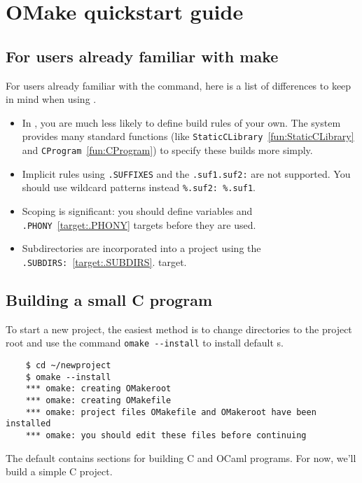 %
%
\chapter{OMake quickstart guide}
\label{chapter:quickstart}

\section{For users already familiar with make}

For users already familiar with the  command, here is a list of
differences to keep in mind when using .

\begin{itemize}
\item In , you are much less likely to define build rules of your own.
  The system provides many standard functions (like \verb+StaticCLibrary+~\ref{fun:StaticCLibrary} and \verb+CProgram+~\ref{fun:CProgram})
  to specify these builds more simply.
\item Implicit rules using \verb+.SUFFIXES+ and the \verb+.suf1.suf2:+ are not supported.
  You should use wildcard patterns instead \verb+%.suf2: %.suf1+.
\item Scoping is significant: you should define variables and \verb+.PHONY+~\ref{target:.PHONY} targets before they are used.
\item Subdirectories are incorporated into a project using the \verb+.SUBDIRS:+~\ref{target:.SUBDIRS}.
  target.
\end{itemize}

\section{Building a small C program}

To start a new project, the easiest method is to change directories to the project
root and use the command \verb+omake --install+ to install default s.

\begin{verbatim}
    $ cd ~/newproject
    $ omake --install
    *** omake: creating OMakeroot
    *** omake: creating OMakefile
    *** omake: project files OMakefile and OMakeroot have been installed
    *** omake: you should edit these files before continuing
\end{verbatim}

The default  contains sections for building C and OCaml programs.
For now, we'll build a simple C project.

